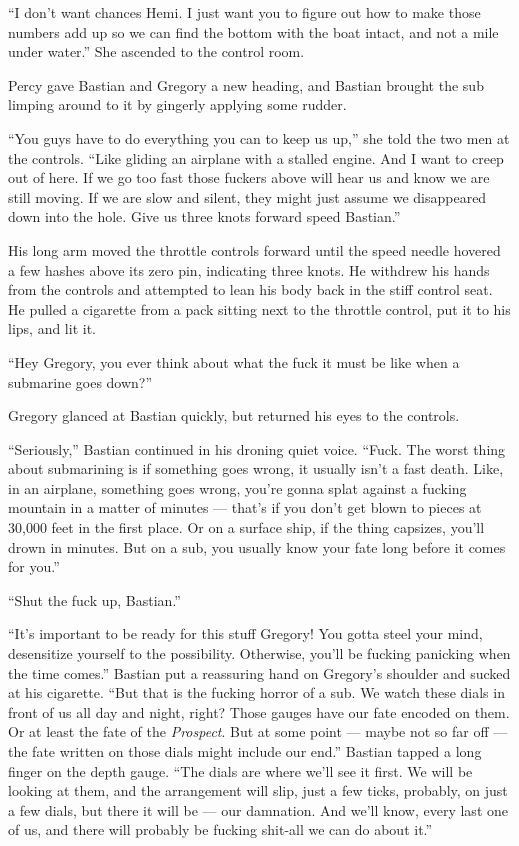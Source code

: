 \documentclass[
]{scrbook}
\begin{document}
``I don't want chances Hemi. I just want you to figure out how to make
those numbers add up so we can find the bottom with the boat intact, and
not a mile under water.'' She ascended to the control room.

\bigskip

Percy gave Bastian and Gregory a new heading, and Bastian brought the
sub limping around to it by gingerly applying some rudder.

``You guys have to do everything you can to keep us up,'' she told the
two men at the controls. ``Like gliding an airplane with a stalled
engine. And I want to creep out of here. If we go too fast those fuckers
above will hear us and know we are still moving. If we are slow and
silent, they might just assume we disappeared down into the hole. Give
us three knots forward speed Bastian.''

His long arm moved the throttle controls forward until the speed needle
hovered a few hashes above its zero pin, indicating three knots. He
withdrew his hands from the controls and attempted to lean his body back
in the stiff control seat. He pulled a cigarette from a pack sitting
next to the throttle control, put it to his lips, and lit it.

``Hey Gregory, you ever think about what the fuck it must be like when a
submarine goes down?''

Gregory glanced at Bastian quickly, but returned his eyes to the
controls.

``Seriously,'' Bastian continued in his droning quiet voice. ``Fuck. The
worst thing about submarining is if something goes wrong, it usually
isn't a fast death. Like, in an airplane, something goes wrong, you're
gonna splat against a fucking mountain in a matter of minutes --- that's
if you don't get blown to pieces at 30,000 feet in the first place. Or
on a surface ship, if the thing capsizes, you'll drown in minutes. But
on a sub, you usually know your fate long before it comes for you.''

``Shut the fuck up, Bastian.''

``It's important to be ready for this stuff Gregory! You gotta steel
your mind, desensitize yourself to the possibility. Otherwise, you'll be
fucking panicking when the time comes.'' Bastian put a reassuring hand
on Gregory's shoulder and sucked at his cigarette. ``But that is the
fucking horror of a sub. We watch these dials in front of us all day and
night, right? Those gauges have our fate encoded on them. Or at least
the fate of the \emph{Prospect}. But at some point --- maybe not so far
off --- the fate written on those dials might include our end.'' Bastian
tapped a long finger on the depth gauge. ``The dials are where we'll see
it first. We will be looking at them, and the arrangement will slip,
just a few ticks, probably, on just a few dials, but there it will be
--- our damnation. And we'll know, every last one of us, and there will
probably be fucking shit-all we can do about it.''
\end{document}
